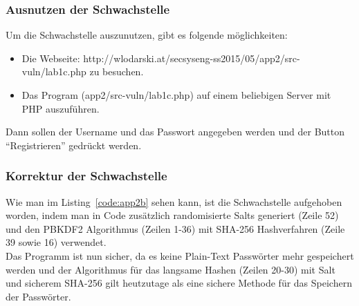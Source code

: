 \documentclass[12pt,a4paper,titlepage,oneside]{scrartcl}
\begin{document}
\subsubsection{Ausnutzen der Schwachstelle}

Um die Schwachstelle auszunutzen, gibt es folgende möglichkeiten:
\begin{itemize}
	\item Die Webseite: http://wlodarski.at/secsyseng-ss2015/05/app2/src-vuln/lab1c.php zu besuchen.
	\item Das Program (app2/src-vuln/lab1c.php) auf einem beliebigen Server mit PHP auszuführen.
\end{itemize}
Dann sollen der Username und das Passwort angegeben werden und der Button "`Registrieren"' gedrückt werden.

\subsubsection{Korrektur der Schwachstelle}

Wie man im Listing~\ref*{code:app2b} sehen kann, ist die Schwachstelle aufgehoben worden,
indem man in Code zusätzlich randomisierte Salts generiert (Zeile 52) und den
PBKDF2 Algorithmus (Zeilen 1-36) mit SHA-256 Hashverfahren (Zeile 39 sowie 16) verwendet. \\[0.5em]
Das Programm ist nun sicher, da es keine Plain-Text Passwörter mehr gespeichert werden
und der Algorithmus für das langsame Hashen (Zeilen 20-30) mit Salt und sicherem SHA-256
gilt heutzutage als eine sichere Methode für das Speichern der Passwörter.
\end{document}
